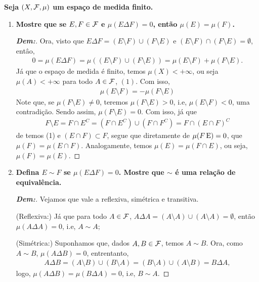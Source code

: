 \newpage 
{}
\myexe{\thedois}
\bigline 
\textbf{Seja $(X, \mathcal F, \mu)$ um espaço de medida finito.} 
\begin{enumerate}[label=(\alph*), wide, labelindent=0pt]
  \item \textbf{Mostre que se $E, F \in \mathcal F$ e $\mu(E \Delta F) = 0$, 
    então $\mu(E) = \mu(F)$.}
    \begin{proof}[\textbf{Dem:}] Ora, visto que 
      $E \Delta F = (E \setminus F) \cup (F \setminus E)$ e 
      $(E\setminus F)\cap (F \setminus E) = \emptyset$, entâo, 
      \begin{align*}
        0 = \mu(E\Delta F) = \mu((E \setminus F) \cup (F \setminus E))
        = \mu(E\setminus F) + \mu(F\setminus E).
      \end{align*}
      Já que o espaço de medida é finito, temos $\mu(X)<+\infty$, ou seja $\mu(A) < +\infty$
      para todo $A \in \mathcal F$, $(1)$. Com isso, 
      \begin{align*}
        \mu(E\setminus F) = -\mu(F\setminus E)
      \end{align*}
      Note que, se $\mu(F\setminus E) \neq 0$, teremos $\mu(F \setminus E) > 0$, i.e, 
      $\mu(E \setminus F) < 0$, uma contradição. Sendo assim, $\mu(F \setminus E) = 0$. 
      Com isso, já que 
      \begin{align*}
        F\setminus E = F \cap E^C = (F \cap E^C) \cup (F \cap F^C) = F\cap(E \cap F)^C
      \end{align*}
      de temos (1) e $(E\cap F) \subset F$, segue que diretamente de $\mu(F\operatorname{E}) = 0$,
      que $\mu(F) = \mu(E \cap F)$. Analogamente, temos $\mu(E) = \mu(F \cap E)$, 
      ou seja, $\mu(F) = \mu(E)$.
  \end{proof}
  \item \textbf{Defina $E\sim F$ se $\mu(E \Delta F) = 0$. Mostre que $\sim$ é uma 
    relação de equivalência.}
    \begin{proof}[\textbf{Dem:}]
      Vejamos que vale a reflexiva, simétrica e transitiva. 
     
      \noindent
      (Reflexiva:) Já que para todo $A \in \mathcal F$, $A \Delta A = (A\setminus A) \cup (A \setminus A) = \emptyset$, 
      então $\mu(A\Delta A) = 0$, i.e, $A \sim A$;
      
      \noindent 
      (Simétrica:) Suponhamos que, dados $A, B \in \mathcal F$, temos $A \sim B$. Ora, como $A \sim B$, 
      $\mu(A\Delta B) = 0$, entrentanto,
      \begin{align*}
        A\Delta B = (A\setminus B) \cup (B \setminus A) = (B \setminus A) \cup (A \setminus B) = B\Delta A,
      \end{align*}
      logo, $\mu(A\Delta B) = \mu(B\Delta A) = 0$, i.e, $B \sim A$.


\end{proof}
\end{enumerate}
